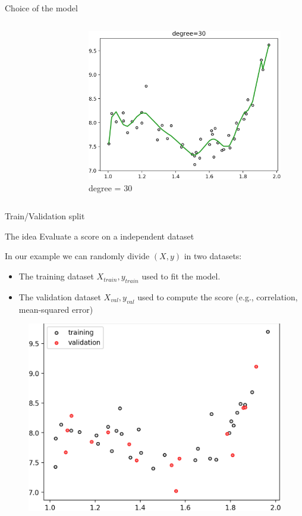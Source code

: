 \documentclass[handout]{beamer}
\begin{document}
\begin{frame}{Choice of the model}
\begin{columns}
\begin{figure}
    \end{figure}
\pause
    \begin{figure}
    \caption*{degree = 30 }
    \includegraphics[width=\textwidth]{fig/L1/interp-pol-30.png}
    \end{figure}
 
\end{columns}
   
\end{frame}


\begin{frame}{Train/Validation split}
\begin{block}{The idea}
Evaluate a score on a independent dataset
\end{block}
\pause
In our example we can randomly divide $(X,y)$ in two datasets:
\begin{itemize}
    \item The training dataset $X_{train},y_{train}$ used to fit the  model.
    \item The validation dataset $X_{val},y_{val}$ used to compute the score (e.g., correlation, mean-squared error)
\end{itemize}

    \begin{figure}
    \includegraphics[width=.4\textwidth]{fig/L1/datasplit.png}
    \end{figure}

\end{frame}
\end{document}
